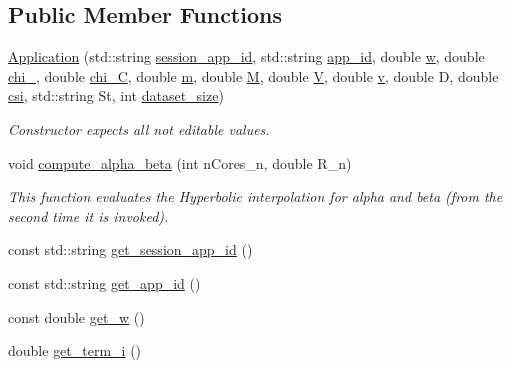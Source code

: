 \subsection*{Public Member Functions}
\begin{DoxyCompactItemize}
\item 
\hyperlink{classApplication_a3413eb5b5ba7bd2d1dfe2ce6d2e28c48}{Application} (std\-::string \hyperlink{classApplication_a6152c40564d526b9b60871c98f7a51c7}{session\-\_\-app\-\_\-id}, std\-::string \hyperlink{classApplication_a5cedee59cfd3cbf89d02174e2f521493}{app\-\_\-id}, double \hyperlink{classApplication_a89e171cf287b09ce4b37dd94c0d61e2b}{w}, double \hyperlink{classApplication_a6066fad4c229a6035652efd712d0d78c}{chi\-\_}, double \hyperlink{classApplication_a73d8a1604a2b2c99b14db1c8bd9c2798}{chi\-\_\-\-C}, double \hyperlink{classApplication_ad95ca8809237917d16779d7ed0013c8e}{m}, double \hyperlink{classApplication_a98cc47f6aa4ac3c70133d2922952ef7a}{M}, double \hyperlink{classApplication_a03a99fa3553c376653e53bb5f489c316}{V}, double \hyperlink{classApplication_a57853498c230af817bc4173169847bfc}{v}, double D, double \hyperlink{classApplication_a7c4d5b6d8d7b2c480008dbd958872ed2}{csi}, std\-::string St, int \hyperlink{classApplication_a83bcec93383a2816d9bbaa51b7dfa0c6}{dataset\-\_\-size})
\begin{DoxyCompactList}\small\item\em Constructor expects all not editable values. \end{DoxyCompactList}\item 
void \hyperlink{classApplication_a892d318a87da1f066843c63d64eb6b95}{compute\-\_\-alpha\-\_\-beta} (int n\-Cores\-\_\-n, double R\-\_\-n)
\begin{DoxyCompactList}\small\item\em This function evaluates the Hyperbolic interpolation for alpha and beta (from the second time it is invoked). \end{DoxyCompactList}\item 
const std\-::string \hyperlink{classApplication_a8c2e8eb2e76e8cb32ec7f6a41aba0758}{get\-\_\-session\-\_\-app\-\_\-id} ()
\item 
const std\-::string \hyperlink{classApplication_a4de60db623cbf250ea53805cd86cab06}{get\-\_\-app\-\_\-id} ()
\item 
const double \hyperlink{classApplication_a8fcbf0ab476dd0d53e7e20f37e3b0543}{get\-\_\-w} ()
\item 
double \hyperlink{classApplication_a19089a029251a3034747866c2084f4af}{get\-\_\-term\-\_\-i} ()

\end{DoxyCompactItemize}
